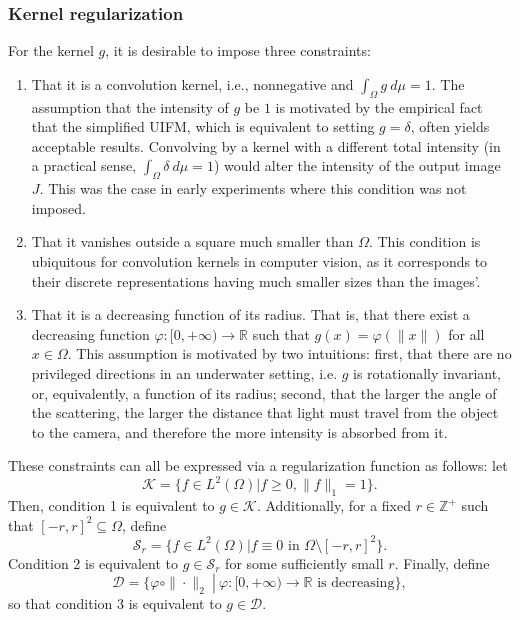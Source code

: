 \documentclass[twocolumn,twoside,a4paper,10pt]{IEEEtran}
\begin{document}
\subsubsection{Kernel regularization}
For the kernel \(g\), it is desirable to impose three constraints:
\begin{enumerate}
  \item \label{kernel-regularization-1}That it is a convolution kernel, i.e., nonnegative and \(\int_{\Omega}g~d\mu = 1\). The assumption that the intensity of \(g\) be \(1\) is motivated by the empirical fact that the simplified UIFM, which is equivalent to setting \(g=\delta\), often yields acceptable results. Convolving by a kernel with a different total intensity (in a practical sense, \(\int_{\Omega}\delta~d\mu=1\)) would alter the intensity of the output image \(J\). This was the case in early experiments where this condition was not imposed.
  \item That it vanishes outside a square much smaller than \(\Omega\). This condition is ubiquitous for convolution kernels in computer vision, as it corresponds to their discrete representations having much smaller sizes than the images'.
  \item That it is a decreasing function of its radius. That is, that there exist a decreasing function \(\varphi\colon [0, +\infty)\to \mathbb{R}\) such that \(g(x)=\varphi(\|x\|)\) for all \(x\in\Omega\). This assumption is motivated by two intuitions: first, that there are no privileged directions in an underwater setting, i.e. \(g\) is rotationally invariant, or, equivalently, a function of its radius; second, that the larger the angle of the scattering, the larger the distance that light must travel from the object to the camera, and therefore the more intensity
  is absorbed from it.
\end{enumerate}

These constraints can all be expressed via a regularization function as follows: let \[\mathcal{K}=\{f\in L^2(\Omega) | f\geq 0, \|f\|_{1}=1\}.\] Then, condition 1 is equivalent to \(g\in \mathcal{K}\). Additionally, for a fixed \(r\in\mathbb{Z}^+\) such that \([-r, r]^2\subseteq\Omega\), define \[\mathcal{S}_r = \{f\in L^2(\Omega) | f\equiv 0 \text{~in~} \Omega\setminus [-r, r]^2\}.\] Condition 2 is equivalent to \(g\in \mathcal{S}_r\) for some sufficiently small \(r\). Finally, define \[\mathcal{D}=\{\left.\varphi\circ\|\cdot\|_{2} ~\right|~ \varphi\colon[0,+\infty)\to \mathbb{R} \text{ is decreasing}\},\] so that condition 3 is equivalent to \(g\in \mathcal{D}\).
\end{document}

